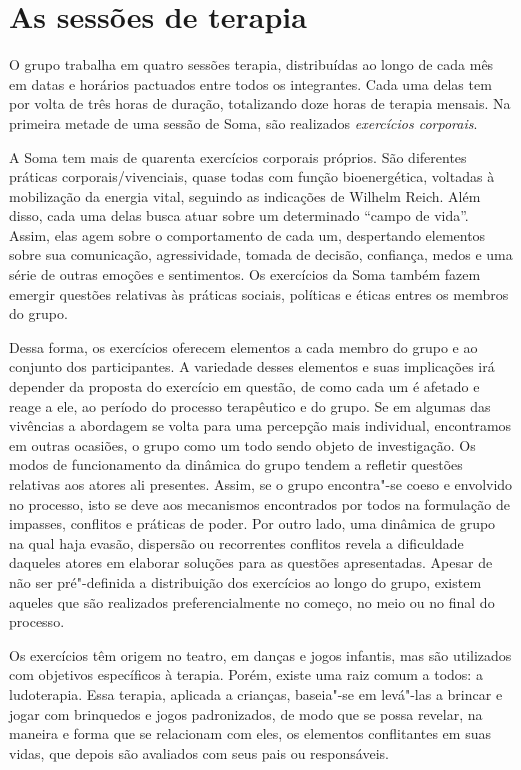 \section{As sessões de terapia}

O grupo trabalha em quatro sessões terapia, distribuídas ao longo de
cada mês em datas e horários pactuados entre todos os integrantes. Cada
uma delas tem por volta de três horas de duração, totalizando doze horas
de terapia mensais. Na primeira metade de uma sessão de Soma, são
realizados \emph{exercícios corporais}.

A Soma tem mais de quarenta exercícios corporais próprios. São
diferentes práticas corporais/vivenciais, quase todas com função
bioenergética, voltadas à mobilização da energia vital, seguindo as
indicações de Wilhelm Reich. Além disso, cada uma delas busca atuar
sobre um determinado ``campo de vida''. Assim, elas agem sobre o
comportamento de cada um, despertando elementos sobre sua comunicação,
agressividade, tomada de decisão, confiança, medos e uma série de outras
emoções e sentimentos. Os exercícios da Soma também fazem emergir
questões relativas às práticas sociais, políticas e éticas entres os
membros do grupo.

Dessa forma, os exercícios oferecem elementos a cada membro do grupo e
ao conjunto dos participantes. A variedade desses elementos e suas
implicações irá depender da proposta do exercício em questão, de como
cada um é afetado e reage a ele, ao período do processo terapêutico e do
grupo. Se em algumas das vivências a abordagem se volta para uma
percepção mais individual, encontramos em outras ocasiões, o grupo como
um todo sendo objeto de investigação. Os modos de funcionamento da
dinâmica do grupo tendem a refletir questões relativas aos atores ali
presentes. Assim, se o grupo encontra"-se coeso e envolvido no processo,
isto se deve aos mecanismos encontrados por todos na formulação de
impasses, conflitos e práticas de poder. Por outro lado, uma dinâmica de
grupo na qual haja evasão, dispersão ou recorrentes conflitos revela a
dificuldade daqueles atores em elaborar soluções para as questões
apresentadas. Apesar de não ser pré"-definida a distribuição dos
exercícios ao longo do grupo, existem aqueles que são realizados
preferencialmente no começo, no meio ou no final do processo.

Os exercícios têm origem no teatro, em danças e jogos infantis, mas são
utilizados com objetivos específicos à terapia. Porém, existe uma raiz
comum a todos: a ludoterapia. Essa terapia, aplicada a crianças,
baseia"-se em levá"-las a brincar e jogar com brinquedos e jogos
padronizados, de modo que se possa revelar, na maneira e forma que se
relacionam com eles, os elementos conflitantes em suas vidas, que depois
são avaliados com seus pais ou responsáveis.

